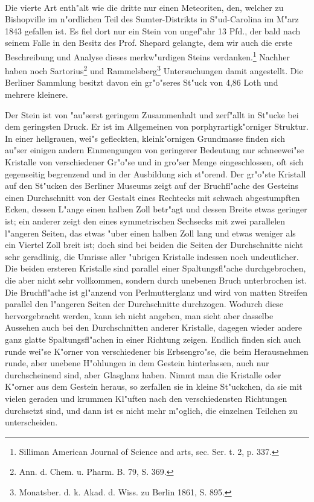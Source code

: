 \documentclass[a4paper, 11pt, oneside, german]{article}
\begin{document}
\paragraph{}
Die vierte Art enth"alt wie die dritte nur einen Meteoriten, den, welcher zu Bishopville im n"ordlichen Teil des Sumter-Distrikts in S"ud-Carolina im M"arz 1843 gefallen ist. Es fiel dort nur ein Stein von ungef"ahr 13 Pfd., der bald nach seinem Falle in den Besitz des Prof. Shepard gelangte, dem wir auch die erste Beschreibung und Analyse dieses merkw"urdigen Steins verdanken.\footnote{Silliman American Journal of Science and arts, sec. Ser. t. 2, p. 337.} Nachher haben noch Sartorius\footnote{Ann. d. Chem. u. Pharm. B. 79, S. 369.} und Rammelsberg\footnote{Monatsber. d. k. Akad. d. Wiss. zu Berlin 1861, S. 895.} Untersuchungen damit angestellt. Die Berliner Sammlung besitzt davon ein gr"o"seres St"uck von 4,86 Loth und mehrere kleinere.

Der Stein ist von "au"serst geringem Zusammenhalt und zerf"allt in St"ucke bei dem geringsten Druck. Er ist im Allgemeinen von porphyrartigk"orniger Struktur. In einer hellgrauen, wei"s gefleckten, kleink"ornigen Grundmasse finden sich au"ser einigen andern Einmengungen von geringerer Bedeutung nur schneewei"se Kristalle von verschiedener Gr"o"se und in gro"ser Menge eingeschlossen, oft sich gegenseitig begrenzend und in der Ausbildung sich st"orend. Der gr"o"ste Kristall auf den St"ucken des Berliner Museums zeigt auf der Bruchfl"ache des Gesteins einen Durchschnitt von der Gestalt eines Rechtecks mit schwach abgestumpften Ecken, dessen L"ange einen halben Zoll betr"agt und dessen Breite etwas geringer ist; ein anderer zeigt den eines symmetrischen Sechsecks mit zwei parallelen l"angeren Seiten, das etwas "uber einen halben Zoll lang und etwas weniger als ein Viertel Zoll breit ist; doch sind bei beiden die Seiten der Durchschnitte nicht sehr geradlinig, die Umrisse aller "ubrigen Kristalle indessen noch undeutlicher. Die beiden ersteren Kristalle sind parallel einer Spaltungsfl"ache durchgebrochen, die aber nicht sehr vollkommen, sondern durch unebenen Bruch unterbrochen ist. Die Bruchfl"ache ist gl"anzend von Perlmutterglanz und wird von matten Streifen parallel den l"angeren Seiten der Durchschnitte durchzogen. Wodurch diese hervorgebracht werden, kann ich nicht angeben, man sieht aber dasselbe Aussehen auch bei den Durchschnitten anderer Kristalle, dagegen wieder andere ganz glatte Spaltungsfl"achen in einer Richtung zeigen. Endlich finden sich auch runde wei"se K"orner von verschiedener bis Erbsengro"se, die beim Herausnehmen runde, aber unebene H"ohlungen in dem Gestein hinterlassen, auch nur durchscheinend sind, aber Glasglanz haben. Nimmt man die Kristalle oder K"orner aus dem Gestein heraus, so zerfallen sie in kleine St"uckchen, da sie mit vielen geraden und krummen Kl"uften nach den verschiedensten Richtungen durchsetzt sind, und dann ist es nicht mehr m"oglich, die einzelnen Teilchen zu unterscheiden.
\end{document}
